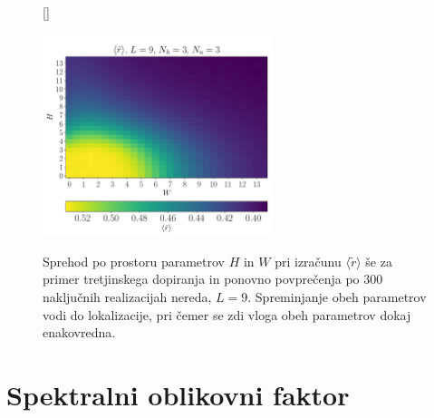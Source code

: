 \begin{figure}[H]
[\FBwidth]
{\caption{Sprehod po prostoru parametrov $H$ in $W$ pri izračunu $\langle \tilde{r}\rangle$ še za primer tretjinskega dopiranja in ponovno povprečenja po 300 naključnih realizacijah nereda, $L=9$. Spreminjanje obeh parametrov vodi do lokalizacije, pri čemer se zdi vloga obeh parametrov dokaj enakovredna. }\label{fig:r_density_9_3_3}}
{\includegraphics[width=0.6\textwidth]{r_density_9_3_3.pdf}}
\end{figure}
\section{Spektralni oblikovni faktor}

 \begin{figure}[H]
\caption{}
\label{fig:W_sweep_sff_disorder_13_1_6}
\end{figure} 
 \begin{figure}[H]
\caption{}
\label{fig:H_sweep_sff_disorder_13_1_6}
\end{figure}

